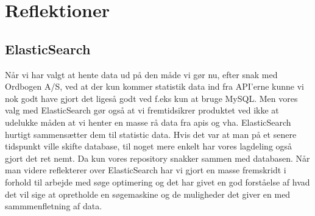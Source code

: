 \section{Reflektioner}
\subsection{ElasticSearch}
Når vi har valgt at hente data ud på den måde vi gør nu, efter snak med Ordbogen A/S, ved at der kun kommer statistik data ind fra API'erne
kunne vi nok godt have gjort det ligeså godt ved f.eks kun at bruge MySQL.
Men vores valg med ElasticSearch gør også at vi fremtidsikrer produktet ved ikke at udelukke måden 
at vi henter en masse rå data fra apis og vha. ElasticSearch hurtigt sammensætter dem til statistic data.
Hvis det var at man på et senere tidspunkt ville skifte database, til noget mere enkelt har vores lagdeling også gjort det ret nemt. 
Da kun vores repository snakker sammen med databasen.
Når man videre reflekterer over ElasticSearch har vi gjort en masse fremskridt i forhold til arbejde med søge optimering og
det har givet en god forståelse af hvad det vil sige at opretholde en søgemaskine og de muligheder det giver en med sammmenfletning af data.

